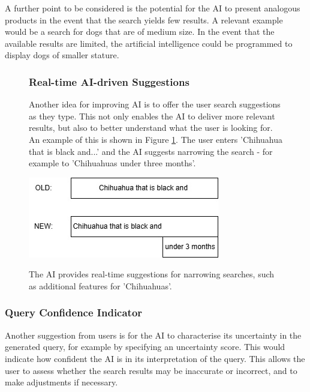 \documentclass[../../submission.tex]{subfiles}
\begin{document}
A further point to be considered is the potential for the AI to present analogous
 products in the event that the search yields few results. A relevant example  
 would be a search for dogs that are of medium size. In the event that the available 
 results are limited, the artificial intelligence could be programmed to display dogs of 
 smaller stature.

\begin{figure}[h]
    \centering
    \begin{minipage}{0.35\textwidth}
        \subsubsection{Real-time AI-driven Suggestions}
        Another idea for improving AI is to offer the user search suggestions as they type. 
        This not only enables the AI to deliver more relevant results, but also to better understand what the user is looking for.
        An example of this is shown in Figure \ref{fig:suggestions}. The user enters 'Chihuahua that is black and...' and the AI suggests narrowing the 
        search - for example to 'Chihuahuas under three months'.
    \end{minipage}
    \hfill
    \begin{minipage}{0.55\textwidth}
        \includegraphics[width=\textwidth]{images/vorschlag}
        \caption{The AI provides real-time suggestions for narrowing searches, such as additional features for 'Chihuahuas'.}
        \Description{}
        \label{fig:suggestions}
    \end{minipage}
\end{figure}
 

 
 \subsubsection{Query Confidence Indicator}   
 
 Another suggestion from users is for the AI to characterise its uncertainty in the 
 generated query, for example by specifying an uncertainty score. This would indicate 
 how confident the AI is in its interpretation of the query. This allows the user to assess 
 whether the search results may be inaccurate or incorrect, and to make adjustments 
 if necessary.
\end{document}
